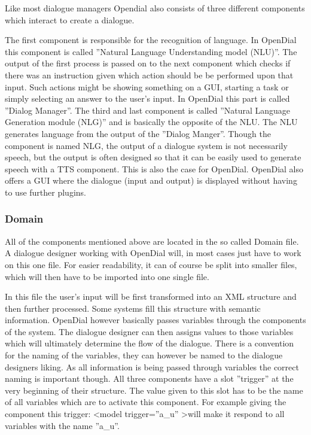 \documentclass[a4paper, 12pt]{article}
\begin{document}
Like most dialogue managers Opendial also consists of three different components which interact to create a dialogue. 

The first component is responsible for the recognition of language. 
In OpenDial this component is called ”Natural Language Understanding model (NLU)”. 
The output of the first process is passed on to the next component which checks if there was an instruction given which action should be be performed upon that input. 
Such actions might be showing something on a GUI, starting a task or simply selecting an answer to the user's input. 
In OpenDial this part is called ”Dialog Manager”.
The third and last component is called ”Natural Language Generation module (NLG)” and is basically the opposite of the NLU. 
The NLU generates language from the output of the ”Dialog Manger”. 
Though the component is named NLG, the output of a dialogue system is not necessarily speech, but the output is often designed so that it can be easily used to generate speech with a TTS component. 
This is also the case for OpenDial. 
OpenDial also offers a GUI where the dialogue (input and output) is displayed without having to use further plugins.

\subsubsection{Domain}

All of the components mentioned above are located in the so called Domain file.
A dialogue designer working with OpenDial will, in most cases just have to work on this one file. 
For easier readability, it can of course be split into smaller files, which will then have to be imported into one single file. 


In this file the user's input will be first transformed into an XML structure and then further processed.
Some systems fill this structure with semantic information. 
OpenDial however basically passes variables through the components of the system. 
The dialogue designer can then assigns values to those variables which will ultimately determine the flow of the dialogue. 
There is a convention for the naming of the variables, they can however be named to the dialogue designers liking. 
As all information is being passed through variables the correct naming is important though. 
All three components have a slot ”trigger” at the very beginning of their structure. 
The value given to this slot has to be the name of all variables which are to activate this component.
For example giving the component this trigger: 
\textless model trigger=”a\_u” \textgreater will make it respond to all variables with the name ”a\_u”.
\end{document}
